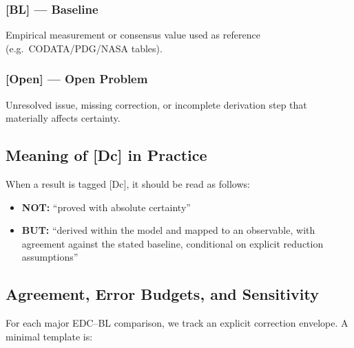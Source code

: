 \subsubsection*{[BL] --- Baseline}
Empirical measurement or consensus value used as reference (e.g.\ CODATA/PDG/NASA tables).

\subsubsection*{[Open] --- Open Problem}
Unresolved issue, missing correction, or incomplete derivation step that materially affects certainty.


\subsection*{Meaning of [Dc] in Practice}

When a result is tagged [Dc], it should be read as follows:

\begin{itemize}
\item \textbf{NOT:} ``proved with absolute certainty''
\item \textbf{BUT:} ``derived within the model and mapped to an observable, with agreement
against the stated baseline, conditional on explicit reduction assumptions''
\end{itemize}


\subsection*{Agreement, Error Budgets, and Sensitivity}

For each major EDC--BL comparison, we track an explicit correction envelope.
A minimal template is:

